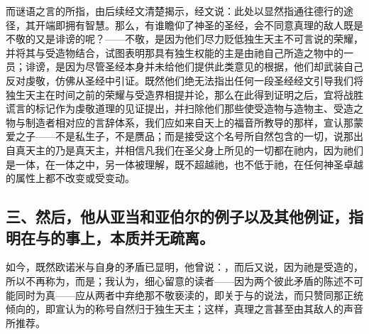 而谜语之言的所指，由后续经文清楚揭示，经文说：此处以显然指通往德行的途径，其开端即拥有智慧。那么，有谁瞻仰了神圣的圣经，会不同意真理的敌人既是不敬的又是诽谤的呢？——不敬，是因为他们尽力贬低独生天主不可言说的荣耀，并将其与受造物结合，试图表明那具有独生权能的主是由祂自己所造之物中的一员；诽谤，是因为尽管圣经本身并未给他们提供此类意见的根据，他们却武装自己反对虔敬，仿佛从圣经中引证。既然他们绝无法指出任何一段圣经经文引导我们将独生天主在时间之前的荣耀与受造界相提并论，那么在此得到证明之后，宜将战胜谎言的标记作为虔敬道理的见证提出，并扫除他们那些使受造物与造物主、受造之物与制造者相对应的言辞体系，我们应如来自天上的福音所教导的那样，宣认那蒙爱之子——不是私生子，不是赝品；而是接受这个名号所自然包含的一切，说那出自真天主的乃是真天主，并相信凡我们在圣父身上所见的一切都在祂内，因为祂们是一体，在一体之中，另一体被理解，既不超越祂，也不低于祂，在任何神圣卓越的属性上都不改变或受变动。\par


\subsection{三、然后，他从亚当和亚伯尔的例子以及其他例证，指明在与的事上，本质并无疏离。}

如今，既然欧诺米与自身的矛盾已显明，他曾说：，而后又说，因为祂是受造的，所以不再称为，而是；我认为，细心留意的读者——因为两个彼此矛盾的陈述不可能同时为真——应从两者中弃绝那不敬亵渎的，即关于与的说法，而只赞同那正统倾向的，即宣认为的称号自然归于独生天主；这样，真理之言甚至由其敌人的声音所推荐。\par

